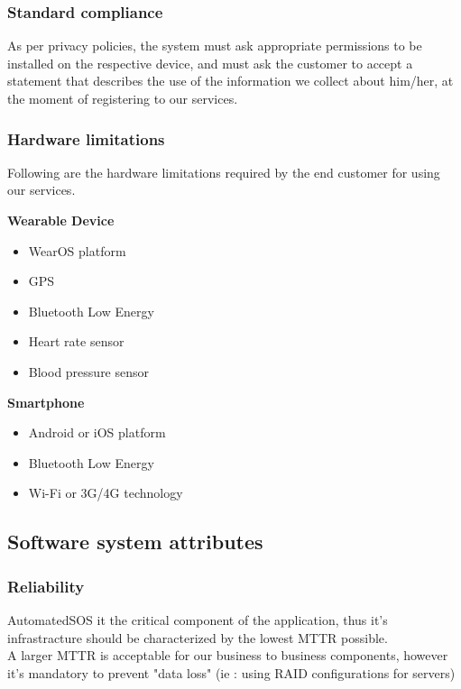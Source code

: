 \documentclass[../main.tex]{subfiles}
\begin{document}
\subsubsection{Standard compliance}

As per privacy policies, the system must ask appropriate permissions to be installed on the respective device, and must ask the customer to accept a statement that describes the use of the information we collect about him/her, at the moment of registering to our services.

\subsubsection{Hardware limitations}

Following are the hardware limitations required by the end customer for using our services.

\vspace*{8mm}
\begin{minipage}{\textwidth}
{\bf Wearable Device}
\begin{itemize}
	\item WearOS platform
	\item GPS
	\item Bluetooth Low Energy
	\item Heart rate sensor
	\item Blood pressure sensor
\end{itemize}
\end{minipage}

\vspace*{8mm}
\begin{minipage}{\textwidth}
{\bf Smartphone}
\begin{itemize}
	\item Android or iOS platform
	\item Bluetooth Low Energy
	\item Wi-Fi or 3G/4G technology
\end{itemize}
\end{minipage}

\subsection{Software system attributes}

\subsubsection{Reliability}
   AutomatedSOS it the critical component of the application, thus it's infrastracture should be characterized by the lowest MTTR possible.\\
   A larger MTTR is acceptable for our business to business components, however it's mandatory to prevent "data loss" (ie : using RAID configurations for servers)
\end{document}
